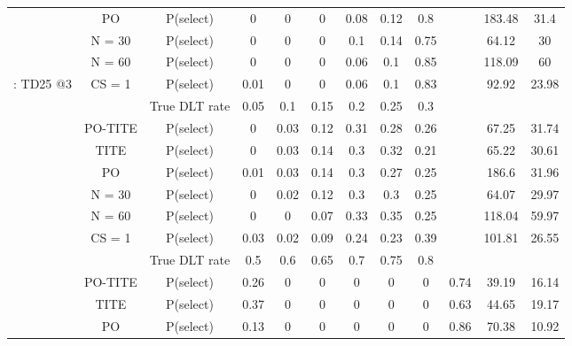 \begin{table}
\begin{singlespace}
{\begin{tabular}[t]{cccccccccccc}
			& PO & P(select) & 0 & 0 & 0 & 0.08 & 0.12 & 0.8 &  & 183.48 & 31.4\\
			
			& N = 30 & P(select) & 0 & 0 & 0 & 0.1 & 0.14 & 0.75 &  & 64.12 & 30\\
			
			& N = 60 & P(select) & 0 & 0 & 0 & 0.06 & 0.1 & 0.85 &  & 118.09 & 60\\
			
			\multirow{-7}{*}{\centering\arraybackslash 6: TD25 @3} & CS = 1 & P(select) & 0.01 & 0 & 0 & 0.06 & 0.1 & 0.83 &  & 92.92 & 23.98\\
			\cmidrule{1-12}
			\rowcolor{gray!6}   &  & True DLT rate & 0.05 & 0.1 & 0.15 & 0.2 & 0.25 & 0.3 &  &  & \\
			
			\rowcolor{gray!6}   & PO-TITE & P(select) & 0 & 0.03 & 0.12 & 0.31 & 0.28 & 0.26 &  & 67.25 & 31.74\\
			
			\rowcolor{gray!6}   & TITE & P(select) & 0 & 0.03 & 0.14 & 0.3 & 0.32 & 0.21 &  & 65.22 & 30.61\\
			
			\rowcolor{gray!6}   & PO & P(select) & 0.01 & 0.03 & 0.14 & 0.3 & 0.27 & 0.25 &  & 186.6 & 31.96\\
			
			\rowcolor{gray!6}   & N = 30 & P(select) & 0 & 0.02 & 0.12 & 0.3 & 0.3 & 0.25 &  & 64.07 & 29.97\\
			
			\rowcolor{gray!6}   & N = 60 & P(select) & 0 & 0 & 0.07 & 0.33 & 0.35 & 0.25 &  & 118.04 & 59.97\\
			
			\rowcolor{gray!6}  \multirow{-7}{*}{\centering\arraybackslash 7: Equal steps} & CS = 1 & P(select) & 0.03 & 0.02 & 0.09 & 0.24 & 0.23 & 0.39 &  & 101.81 & 26.55\\
			\cmidrule{1-12}
			&  & True DLT rate & 0.5 & 0.6 & 0.65 & 0.7 & 0.75 & 0.8 &  &  & \\
			
			& PO-TITE & P(select) & 0.26 & 0 & 0 & 0 & 0 & 0 & 0.74 & 39.19 & 16.14\\
			
			& TITE & P(select) & 0.37 & 0 & 0 & 0 & 0 & 0 & 0.63 & 44.65 & 19.17\\
			
			& PO & P(select) & 0.13 & 0 & 0 & 0 & 0 & 0 & 0.86 & 70.38 & 10.92\\
			

\end{tabular}}
\end{singlespace}
\end{table}

